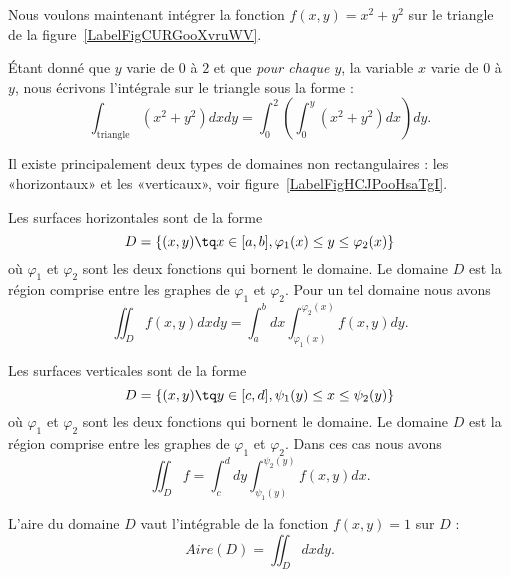 Nous voulons maintenant intégrer la fonction $f(x,y)=x^2+y^2$ sur le triangle de la figure~\ref{LabelFigCURGooXvruWV}. %
\newcommand{\CaptionFigCURGooXvruWV}{Intégration sur un triangle}


Étant donné que $y$ varie de $0$ à $2$ et que \emph{pour chaque $y$}, la variable $x$ varie de $0$ à $y$, nous écrivons l'intégrale sur le triangle sous la forme :
\begin{equation}
	\int_{\text{triangle}}(x^2+y^2)dx dy=\int_0^2\left( \int_0^y(x^2+y^2)dx \right)dy.
\end{equation}

Il existe principalement deux types de domaines non rectangulaires : les «horizontaux» et les «verticaux», voir figure~\ref{LabelFigHCJPooHsaTgI}. %
\newcommand{\CaptionFigHCJPooHsaTgI}{Deux types de surfaces. Nous avons tracé un rectangle qui contient chacune des deux surfaces. L'intégrale sur un domaine sera l'intégrale sur le rectangle de la fonction qui vaut zéro en dehors du domaine.}


Les surfaces horizontales sont de la forme
\begin{equation}
    D=\{ (x,y)\tq x\in\mathopen[ a , b \mathclose],\varphi_1(x)\leq y\leq \varphi_2(x) \}
\end{equation}
où $\varphi_1$ et $\varphi_2$ sont les deux fonctions qui bornent le domaine. Le domaine $D$ est la région comprise entre les graphes de $\varphi_1$ et $\varphi_2$. Pour un tel domaine nous avons
\begin{equation}
    \iint_Df(x,y)dxdy=\int_a^bdx\int_{\varphi_1(x)}^{\varphi_2(x)}f(x,y)dy.
\end{equation}

Les surfaces verticales sont de la forme
\begin{equation}
    D=\{ (x,y)\tq y\in\mathopen[ c , d \mathclose],\psi_1(y)\leq x\leq \psi_2(y) \}
\end{equation}
où $\varphi_1$ et $\varphi_2$ sont les deux fonctions qui bornent le domaine. Le domaine $D$ est la région comprise entre les graphes de $\varphi_1$ et $\varphi_2$. Dans ces cas nous avons
\begin{equation}
    \iint_Df=\int_c^d dy\int_{\psi_1(y)}^{\psi_2(y)} f(x,y)dx.
\end{equation}

\begin{proposition}
    L'aire du domaine $D$ vaut l'intégrable de la fonction $f(x,y)=1$ sur $D$ :
    \begin{equation}
        Aire(D)=\iint_Ddxdy.
    \end{equation}
\end{proposition}

